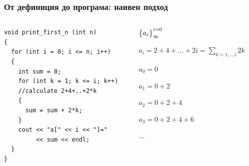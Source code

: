 \documentclass{beamer}
\begin{document}
\begin{frame}[fragile]
\frametitle{От дефиниция до програма: наивен подход}


\begin{columns}[t]
  \begin{column}{0.6\textwidth}

\begin{lstlisting}
void print_first_n (int n)
{
  for (int i = 0; i <= n; i++)
  {
    int sum = 0;  
    for (int k = 1; k <= i; k++)
    //calculate 2+4+..+2*k
    {
      sum = sum + 2*k;
    }
    cout << "a[" << i << "]=" 
         << sum << endl;
  }
}
\end{lstlisting}


  \end{column}
  \begin{column}{0.4\textwidth}
\begin{flushleft}

  $\big{\{}a_i\big{\}}_\infty^{i=0}$

  \vspace{10px}

  $a_i = 2 + 4 + ... + 2i = \sum\limits_{k=1,..,i}2k$


  \vspace{30px}

  $a_0 = 0$

  $a_1 = 0 + 2$

  $a_2 = 0 + 2 + 4$

  $a_3 = 0 + 2 + 4 + 6$ 

  ...


\end{flushleft}
  \end{column}
\end{columns}

\end{frame}
\end{document}
